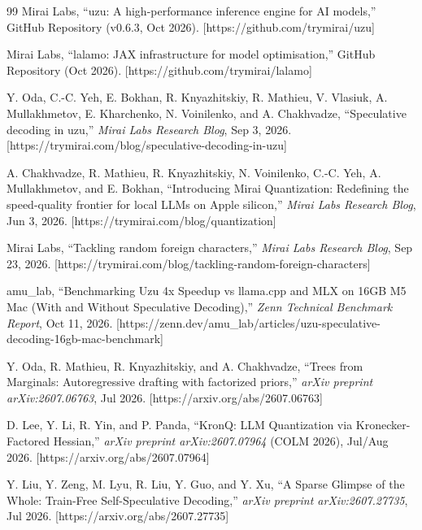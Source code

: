 \documentclass[10pt,a4paper]{article}
\begin{document}
\begin{thebibliography}{99}\setlength{\itemsep}{2pt}\setlength{\parskip}{0pt}\small
{}
Mirai Labs, ``\textsf{uzu}: A high-performance inference engine for AI models,'' GitHub Repository (v0.6.3, Oct 2026). [https://github.com/trymirai/uzu]

Mirai Labs, ``\textsf{lalamo}: JAX infrastructure for model optimisation,'' GitHub Repository (Oct 2026). [https://github.com/trymirai/lalamo]

Y. Oda, C.-C. Yeh, E. Bokhan, R. Knyazhitskiy, R. Mathieu, V. Vlasiuk, A. Mullakhmetov, E. Kharchenko, N. Voinilenko, and A. Chakhvadze, ``Speculative decoding in uzu,'' \emph{Mirai Labs Research Blog}, Sep 3, 2026. [https://trymirai.com/blog/speculative-decoding-in-uzu]

A. Chakhvadze, R. Mathieu, R. Knyazhitskiy, N. Voinilenko, C.-C. Yeh, A. Mullakhmetov, and E. Bokhan, ``Introducing Mirai Quantization: Redefining the speed-quality frontier for local LLMs on Apple silicon,'' \emph{Mirai Labs Research Blog}, Jun 3, 2026. [https://trymirai.com/blog/quantization]

Mirai Labs, ``Tackling random foreign characters,'' \emph{Mirai Labs Research Blog}, Sep 23, 2026. [https://trymirai.com/blog/tackling-random-foreign-characters]

amu\_lab, ``Benchmarking Uzu 4x Speedup vs llama.cpp and MLX on 16GB M5 Mac (With and Without Speculative Decoding),'' \emph{Zenn Technical Benchmark Report}, Oct 11, 2026. [https://zenn.dev/amu\_lab/articles/uzu-speculative-decoding-16gb-mac-benchmark]

Y. Oda, R. Mathieu, R. Knyazhitskiy, and A. Chakhvadze, ``Trees from Marginals: Autoregressive drafting with factorized priors,'' \emph{arXiv preprint arXiv:2607.06763}, Jul 2026. [https://arxiv.org/abs/2607.06763]

D. Lee, Y. Li, R. Yin, and P. Panda, ``KronQ: LLM Quantization via Kronecker-Factored Hessian,'' \emph{arXiv preprint arXiv:2607.07964} (COLM 2026), Jul/Aug 2026. [https://arxiv.org/abs/2607.07964]

Y. Liu, Y. Zeng, M. Lyu, R. Liu, Y. Guo, and Y. Xu, ``A Sparse Glimpse of the Whole: Train-Free Self-Speculative Decoding,'' \emph{arXiv preprint arXiv:2607.27735}, Jul 2026. [https://arxiv.org/abs/2607.27735]


\end{thebibliography}
\end{document}
